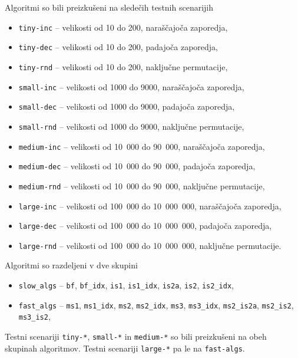 \documentclass[11pt,a4paper]{article}
\theoremstyle{plain}
\theoremstyle{definition}
\begin{document}
Algoritmi so bili preizkušeni na sledečih testnih scenarijih
\begin{itemize}
\item \lstinline!tiny-inc! -- velikosti od 10 do 200, naraščajoča zaporedja,
\item \lstinline!tiny-dec! -- velikosti od 10 do 200, padajoča zaporedja,
\item \lstinline!tiny-rnd! -- velikosti od 10 do 200, naključne permutacije,

\item \lstinline!small-inc! -- velikosti od 1000 do 9000, naraščajoča zaporedja,
\item \lstinline!small-dec! -- velikosti od 1000 do 9000, padajoča zaporedja,
\item \lstinline!small-rnd! -- velikosti od 1000 do 9000, naključne permutacije,

\item \lstinline!medium-inc! -- velikosti od 10~000 do 90~000, naraščajoča zaporedja,
\item \lstinline!medium-dec! -- velikosti od 10~000 do 90~000, padajoča zaporedja,
\item \lstinline!medium-rnd! -- velikosti od 10~000 do 90~000, naključne permutacije,

\item \lstinline!large-inc! -- velikosti od 100~000 do 10~000~000, naraščajoča zaporedja,
\item \lstinline!large-dec! -- velikosti od 100~000 do 10~000~000, padajoča zaporedja,
\item \lstinline!large-rnd! -- velikosti od 100~000 do 10~000~000, naključne permutacije.
\end{itemize}
Algoritmi so razdeljeni v dve skupini
\begin{itemize}
\item \lstinline!slow_algs! -- \lstinline!bf!, \lstinline!bf_idx!, \lstinline!is1!, \lstinline!is1_idx!, \lstinline!is2a!, \lstinline!is2!, \lstinline!is2_idx!,
\item \lstinline!fast_algs! -- \lstinline!ms1!, \lstinline!ms1_idx!, \lstinline!ms2!, \lstinline!ms2_idx!, \lstinline!ms3!, \lstinline!ms3_idx!, \lstinline!ms2_is2a!, \lstinline!ms2_is2!, \lstinline!ms3_is2!,
\end{itemize}

Testni scenariji \lstinline!tiny-*!, \lstinline!small-*! in \lstinline!medium-*! so bili preizkušeni na obeh skupinah algoritmov. Testni scenariji \lstinline!large-*! pa le na \lstinline!fast-algs!.
\end{document}
